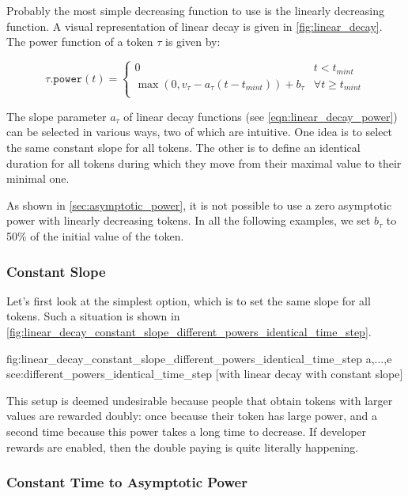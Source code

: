 Probably the most simple decreasing function to use is the linearly decreasing function.
A visual representation of linear decay is given in \cref{fig:linear_decay}.
The power function of a token $\tau$ is given by:

\begin{equation}
  \label{eqn:linear_decay_power}
  \tau\mathtt{.power}(t) = %
  \begin{cases}
    0 & t < t_{mint}\\
    \max\left(0, v_\tau - a_\tau(t - t_{mint})\right) + b_\tau & \forall t\ge t_{mint}\\
  \end{cases}
\end{equation}

The slope parameter $a_\tau$ of linear decay functions (see \cref{eqn:linear_decay_power}) can be selected in various ways, two of which are intuitive.
One idea is to select the same constant slope for all tokens.
The other is to define an identical duration for all tokens during which they move from their maximal value to their minimal one.

As shown in \cref{sec:asymptotic_power}, it is not possible to use a zero asymptotic power with linearly decreasing tokens.
In all the following examples, we set $b_\tau$ to 50\% of the initial value of the token.

\subsubsection{Constant Slope}

Let's first look at the simplest option, which is to set the same slope for all tokens.
Such a situation is shown in \cref{fig:linear_decay_constant_slope_different_powers_identical_time_step}.

  {fig:linear_decay_constant_slope_different_powers_identical_time_step}
  {a,...,e}
  {sce:different_powers_identical_time_step}
  [with linear decay with constant slope]

This setup is deemed undesirable because people that obtain tokens with larger values are rewarded doubly: once because their token has large power, and a second time because this power takes a long time to decrease.
If developer rewards are enabled, then the double paying is quite literally happening.

\subsubsection{Constant Time to Asymptotic Power}

